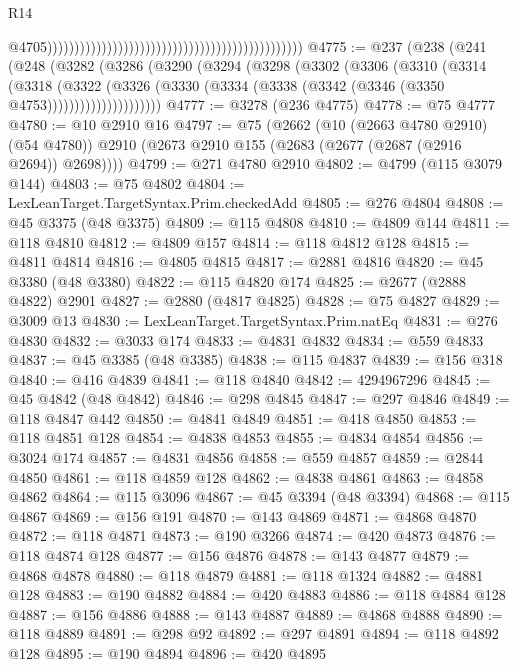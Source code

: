 \begin{lexlean}{R14}
\begin{coremodule}
                                                                                                  @4705)))))))))))))))))))))))))))))))))))))))))))))))
@4775 := @237
    (@238
      (@241
        (@248
          (@3282
            (@3286
              (@3290
                (@3294
                  (@3298
                    (@3302
                      (@3306
                        (@3310
                          (@3314
                            (@3318
                              (@3322
                                (@3326
                                  (@3330
                                    (@3334 (@3338 (@3342 (@3346 (@3350 @4753)))))))))))))))))))))
@4777 := @3278 (@236 @4775)
@4778 := @75 @4777
@4780 := @10 @2910 @16
@4797 := @75
    (@2662
      (@10 (@2663 @4780 @2910) (@54 @4780))
      @2910
      (@2673 @2910 @155 (@2683 (@2677 (@2687 (@2916 @2694)) @2698))))
@4799 := @271 @4780 @2910
@4802 := @4799 (@115 @3079 @144)
@4803 := @75 @4802
@4804 := LexLeanTarget.TargetSyntax.Prim.checkedAdd
@4805 := @276 @4804
@4808 := @45 @3375 (@48 @3375)
@4809 := @115 @4808
@4810 := @4809 @144
@4811 := @118 @4810
@4812 := @4809 @157
@4814 := @118 @4812 @128
@4815 := @4811 @4814
@4816 := @4805 @4815
@4817 := @2881 @4816
@4820 := @45 @3380 (@48 @3380)
@4822 := @115 @4820 @174
@4825 := @2677 (@2888 @4822) @2901
@4827 := @2880 (@4817 @4825)
@4828 := @75 @4827
@4829 := @3009 @13
@4830 := LexLeanTarget.TargetSyntax.Prim.natEq
@4831 := @276 @4830
@4832 := @3033 @174
@4833 := @4831 @4832
@4834 := @559 @4833
@4837 := @45 @3385 (@48 @3385)
@4838 := @115 @4837
@4839 := @156 @318
@4840 := @416 @4839
@4841 := @118 @4840
@4842 := 4294967296
@4845 := @45 @4842 (@48 @4842)
@4846 := @298 @4845
@4847 := @297 @4846
@4849 := @118 @4847 @442
@4850 := @4841 @4849
@4851 := @418 @4850
@4853 := @118 @4851 @128
@4854 := @4838 @4853
@4855 := @4834 @4854
@4856 := @3024 @174
@4857 := @4831 @4856
@4858 := @559 @4857
@4859 := @2844 @4850
@4861 := @118 @4859 @128
@4862 := @4838 @4861
@4863 := @4858 @4862
@4864 := @115 @3096
@4867 := @45 @3394 (@48 @3394)
@4868 := @115 @4867
@4869 := @156 @191
@4870 := @143 @4869
@4871 := @4868 @4870
@4872 := @118 @4871
@4873 := @190 @3266
@4874 := @420 @4873
@4876 := @118 @4874 @128
@4877 := @156 @4876
@4878 := @143 @4877
@4879 := @4868 @4878
@4880 := @118 @4879
@4881 := @118 @1324
@4882 := @4881 @128
@4883 := @190 @4882
@4884 := @420 @4883
@4886 := @118 @4884 @128
@4887 := @156 @4886
@4888 := @143 @4887
@4889 := @4868 @4888
@4890 := @118 @4889
@4891 := @298 @92
@4892 := @297 @4891
@4894 := @118 @4892 @128
@4895 := @190 @4894
@4896 := @420 @4895

\end{coremodule}
\end{lexlean}
